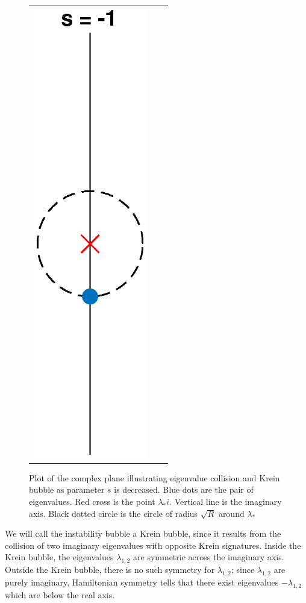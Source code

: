 \documentclass[thesis.tex]{subfiles}
\begin{document}
\begin{figure}
\begin{center}
\begin{tabular}{ccc}
\includegraphics[width=5cm]{images/kreinbubbles/bubbleminusR}
\end{tabular}
\caption{Plot of the complex plane illustrating eigenvalue collision and Krein bubble as parameter $s$ is decreased. Blue dots are the pair of eigenvalues. Red cross is the point $\lambda_* i$. Vertical line is the imaginary axis. Black dotted circle is the circle of radius $\sqrt{R}$ around $\lambda_*$ }
\label{fig:kreinbubbles}
\end{center}
\end{figure}
We will call the instability bubble a Krein bubble, since it results from the collision of two imaginary eigenvalues with opposite Krein signatures. Inside the Krein bubble, the eigenvalues $\lambda_{1,2}$ are symmetric across the imaginary axis. Outside the Krein bubble, there is no such symmetry for $\lambda_{1,2}$; since $\lambda_{1,2}$ are purely imaginary, Hamiltonian symmetry tells that there exist eigenvalues $-\lambda_{1,2}$ which are below the real axis.
\end{document}
